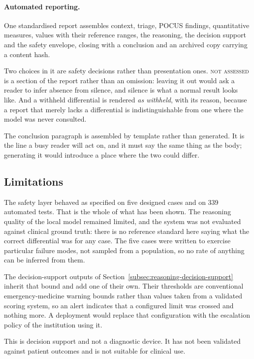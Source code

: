 \paragraph{Automated reporting.} One standardised report assembles context, triage, POCUS
findings, quantitative measures, values with their reference ranges, the reasoning, the
decision support and the safety envelope, closing with a conclusion and an archived copy
carrying a content hash.

Two choices in it are safety decisions rather than presentation ones. \textsc{not assessed} is
a section of the report rather than an omission: leaving it out would ask a reader to infer
absence from silence, and silence is what a normal result looks like. And a withheld
differential is rendered \emph{as withheld}, with its reason, because a report that merely
lacks a differential is indistinguishable from one where the model was never consulted.

The conclusion paragraph is assembled by template rather than generated. It is the line a busy
reader will act on, and it must say the same thing as the body; generating it would introduce
a place where the two could differ.

\subsection{Limitations}
\label{subsec:reasoning-limits}

The safety layer behaved as specified on five designed cases and on 339 automated tests.
That is the whole of what has been shown. The reasoning quality of the local model remained
limited, and the system was not evaluated against clinical ground truth: there is no
reference standard here saying what the correct differential was for any case. The five
cases were written to exercise particular failure modes, not sampled from a population, so
no rate of anything can be inferred from them.

The decision-support outputs of
Section~\ref{subsec:reasoning-decision-support} inherit that bound and add one of their own.
Their thresholds are conventional emergency-medicine warning bounds rather than values taken
from a validated scoring system, so an alert indicates that a configured limit was crossed and
nothing more. A deployment would replace that configuration with the escalation policy of the
institution using it.

This is decision support and not a diagnostic device. It has not been validated against
patient outcomes and is not suitable for clinical use.
